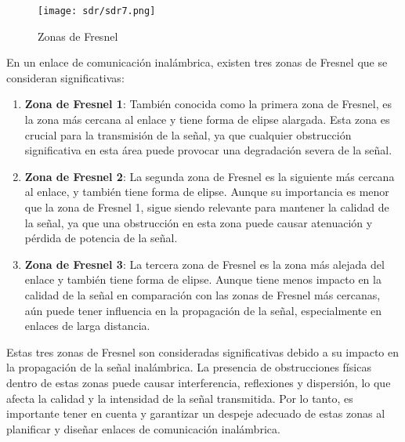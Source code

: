 \documentclass[
	12pt, %
	fleqn, %
	a4paper, %
	oneside, %
]{LegrandOrangeBook}
\begin{document}
\begin{figure}[H]
\centering
\texttt{[image: sdr/sdr7.png]}
\caption{Zonas de Fresnel}
\end{figure}
En un enlace de comunicación inalámbrica, existen tres zonas de Fresnel que se consideran significativas:
\begin{enumerate}
\item \textbf{Zona de Fresnel 1}: También conocida como la primera zona de Fresnel, es la zona más cercana al enlace y tiene forma de elipse alargada. Esta zona es crucial para la transmisión de la señal, ya que cualquier obstrucción significativa en esta área puede provocar una degradación severa de la señal.
\item \textbf{Zona de Fresnel 2}: La segunda zona de Fresnel es la siguiente más cercana al enlace, y también tiene forma de elipse. Aunque su importancia es menor que la zona de Fresnel 1, sigue siendo relevante para mantener la calidad de la señal, ya que una obstrucción en esta zona puede causar atenuación y pérdida de potencia de la señal.
\item \textbf{Zona de Fresnel 3}: La tercera zona de Fresnel es la zona más alejada del enlace y también tiene forma de elipse. Aunque tiene menos impacto en la calidad de la señal en comparación con las zonas de Fresnel más cercanas, aún puede tener influencia en la propagación de la señal, especialmente en enlaces de larga distancia.
\end{enumerate}
Estas tres zonas de Fresnel son consideradas significativas debido a su impacto en la propagación de la señal inalámbrica. La presencia de obstrucciones físicas dentro de estas zonas puede causar interferencia, reflexiones y dispersión, lo que afecta la calidad y la intensidad de la señal transmitida. Por lo tanto, es importante tener en cuenta y garantizar un despeje adecuado de estas zonas al planificar y diseñar enlaces de comunicación inalámbrica.
\end{document}
